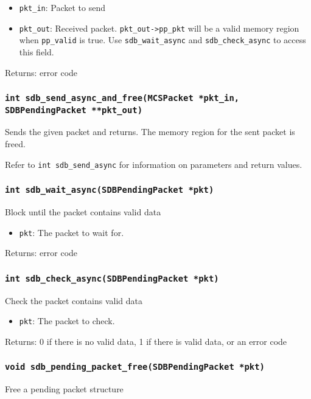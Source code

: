 \documentclass[12pt,a4paper]{report}
\begin{document}
\begin{itemize}
\item \texttt{pkt\_in}: Packet to send
\item \texttt{pkt\_out}: Received packet. \texttt{pkt\_out->pp\_pkt} will be a valid memory region when \texttt{pp\_valid} is true. Use \texttt{sdb\_wait\_async} and \texttt{sdb\_check\_async} to access this field.
\end{itemize}

Returns: error code

\subsubsection*{\texttt{int sdb\_send\_async\_and\_free(MCSPacket *pkt\_in, SDBPendingPacket **pkt\_out)}}
Sends the given packet and returns. The memory region for the sent packet is freed.

Refer to \texttt{int sdb\_send\_async} for information on parameters and return values.

\subsubsection*{\texttt{int sdb\_wait\_async(SDBPendingPacket *pkt)}}
Block until the packet contains valid data

\begin{itemize}
\item \texttt{pkt}: The packet to wait for.
\end{itemize}

Returns: error code

\subsubsection*{\texttt{int sdb\_check\_async(SDBPendingPacket *pkt)}}
Check the packet contains valid data

\begin{itemize}
\item \texttt{pkt}: The packet to check.
\end{itemize}

Returns: 0 if there is no valid data, 1 if there is valid data, or an error code

\subsubsection*{\texttt{void sdb\_pending\_packet\_free(SDBPendingPacket *pkt)}}
Free a pending packet structure
\end{document}
